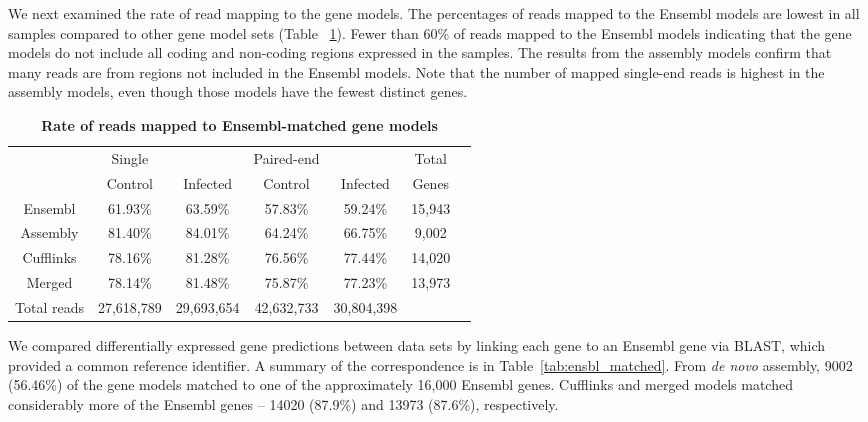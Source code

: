 We next examined the rate of read mapping to the gene
models.  The percentages of reads mapped to the Ensembl
models are lowest in all samples compared to other gene
model sets (Table ~\ref{tab:mapped-reads}).  Fewer than 60\%
of reads mapped to the Ensembl models indicating that the
gene models do not include all coding and non-coding regions
expressed in the samples.  The results from the assembly
models confirm that many reads are from regions not included
in the Ensembl models. Note that the number of mapped
single-end reads is highest in the assembly models, even
though those models have the fewest distinct genes.

\begin{table}[!ht]
\caption{
\textbf{Rate of reads mapped to Ensembl-matched gene models}
}
\begin{center}
\begin{tabular}{ccccccc}
\hline
& Single & & Paired-end & & Total & \\
& Control & Infected & Control & Infected & Genes \\
\hline
Ensembl & 61.93\% & 63.59\% & 57.83\% & 59.24\% & 15,943 \\
Assembly & 81.40\% & 84.01\% & 64.24\% & 66.75\% & 9,002 \\
Cufflinks & 78.16\% & 81.28\% & 76.56\% & 77.44\% & 14,020 \\
Merged & 78.14\% & 81.48\% & 75.87\% & 77.23\% & 13,973 \\
Total reads & 27,618,789 & 29,693,654 & 42,632,733 & 30,804,398 & \\
\hline
\end{tabular}
\end{center}
\label{tab:mapped-reads}
\end{table}

We compared differentially expressed gene predictions
between data sets by linking each gene to an Ensembl gene
via BLAST, which provided a common reference identifier.  A
summary of the correspondence is in
Table~\ref{tab:ensbl_matched}.  From {\em de novo} assembly,
9002 (56.46\%) of the gene models matched to one of the
approximately 16,000 Ensembl genes.  Cufflinks and merged
models matched considerably more of the Ensembl genes --
14020 (87.9\%) and 13973 (87.6\%), respectively.

